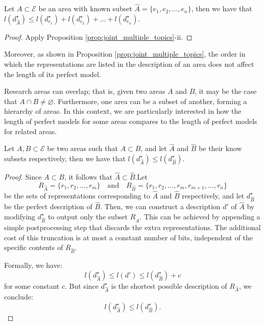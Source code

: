 \begin{proposition}
Let $A \subset \mathcal{E}$ be an area with known subset $\hat{A} = \{e_1, e_2, \ldots, e_n\}$, then we have that $l \left( d_{\hat{A}}^{\star} \right) \leq l(d_ {e_1}^\star) + l(d_ {e_2}^\star) + \ldots + l(d_ {e_n}^\star)$.
\end{proposition}
\begin{proof}
Apply Proposition \ref{prop:joint_multiple_topics}-ii. 
\end{proof}

Moreover, as shown in Proposition \ref{prop:joint_multiple_topics}, the order in which the representations are listed in the description of an area does not affect the length of its perfect model.

Research areas can overlap; that is, given two areas $A$ and $B$, it may be the case that $A \cap B \neq \varnothing$. Furthermore, one area can be a subset of another, forming a hierarchy of areas. In this context, we are particularly interested in how the length of perfect models for some areas compares to the length of perfect models for related areas.

\begin{proposition}
Let $A, B \subset \mathcal{E}$ be two areas such that $A \subset B$, and let $\hat{A}$ and $\hat{B}$ be their know subsets respectively, then we have that $l \left( d_{\hat{A}}^{\star} \right) \leq l \left( d_{\hat{B}}^{\star} \right)$.
\end{proposition}
\begin{proof}
Since $A \subset B$, it follows that $\hat{A} \subset \hat{B}$.Let
$$
R_{\hat{A}} = \{r_1, r_2, \ldots, r_m\} \quad \text{and} \quad R_{\hat{B}} = \{r_1, r_2, \ldots, r_m, r_{m+1}, \ldots, r_n\}
$$
be the sets of representations corresponding to $\hat{A}$ and $\hat{B}$ respectively, and let $d_{\hat{B}}^{\star}$ be the perfect description of $\hat{B}$. Then, we can construct a description $d'$ of $\hat{A}$ by modifying $d_{\hat{B}}^{\star}$ to output only the subset $R_{\hat{A}}$. This can be achieved by appending a simple postprocessing step that discards the extra representations. The additional cost of this truncation is at most a constant number of bits, independent of the specific contents of $R_{\hat{B}}$.

Formally, we have:
$$
l(d_{\hat{A}}^{\star}) \leq l(d') \leq l(d_{\hat{B}}^{\star}) + c
$$
for some constant $c$. But since $d_{\hat{A}}^{\star}$ is the shortest possible description of $R_{\hat{A}}$, we conclude:
$$
l(d_{\hat{A}}^{\star}) \leq l(d_{\hat{B}}^{\star}).
$$
\end{proof}

